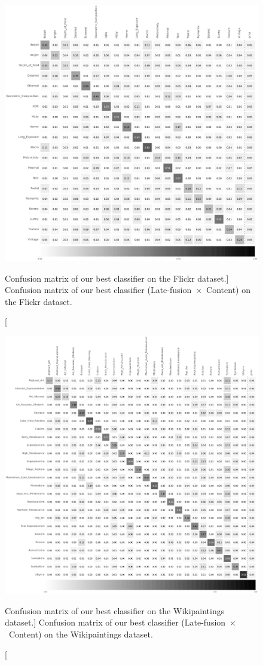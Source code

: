 \begin{figure}[ht!]
\centering
\includegraphics[width=1\linewidth]{../style/figures/evaluation/flickr_conf.pdf}
\caption
[Confusion matrix of our best classifier on the Flickr dataset.]
{Confusion matrix of our best classifier (\mbox{Late-fusion $\times$ Content}) on the Flickr dataset.}
\label{fig:flickr_conf}
\end{figure}

\begin{figure}[ht!]
\centering
\includegraphics[width=1\linewidth]{../style/figures/evaluation/wikipaintings_conf.pdf}
\caption
[Confusion matrix of our best classifier on the Wikipaintings dataset.]
{Confusion matrix of our best classifier (\mbox{Late-fusion $\times$ Content}) on the Wikipaintings dataset.}
\label{fig:wp_conf}
\end{figure}
